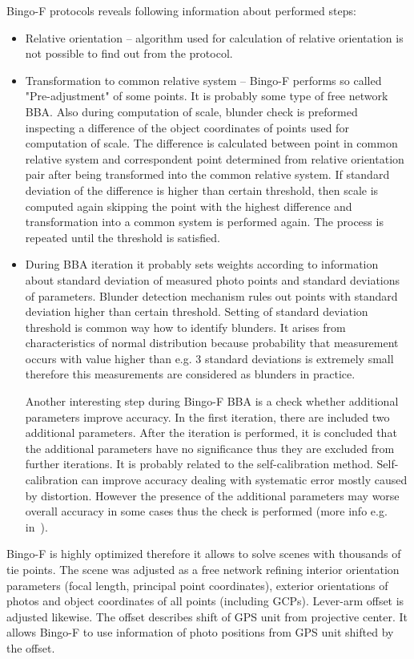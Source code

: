 \documentclass[a4paper,12pt]{article}
\begin{document}
Bingo-F protocols reveals following information about performed steps: 
\begin{itemize}
\item Relative orientation -- algorithm used for calculation of relative orientation is not possible to find out from the protocol.  
\item Transformation to common relative system -- Bingo-F performs so called "Pre-adjustment" of some points. It is probably some type of free network 
BBA. Also during computation of scale, blunder check is preformed inspecting a difference of the object coordinates of points 
used for computation of scale. The difference is calculated between point in common relative system 
and correspondent point determined from relative orientation pair after being transformed into the common relative system.
If standard deviation of the difference is higher than certain threshold, then 
scale is computed again skipping the point with the highest difference and 
transformation into a common system is performed again.
The process is repeated  until  the threshold is satisfied.
\item During BBA iteration it probably sets weights according to information about standard deviation of measured photo points 
and standard deviations of parameters. 
Blunder detection mechanism rules out points with
standard deviation higher than certain threshold. Setting of standard deviation threshold  is common way how to identify 
blunders. It arises from characteristics of normal distribution because probability that measurement occurs with value 
 higher than e.g. 3 standard deviations is extremely small therefore this measurements are considered as blunders in practice.
 
 Another interesting step during Bingo-F BBA is a check whether additional parameters improve accuracy. 
 In the first iteration, there are included two additional parameters. After 
 the iteration is performed, it is concluded that the additional parameters have no significance thus 
 they are excluded from further iterations. It is probably related to the self-calibration 
 method. Self-calibration can improve accuracy dealing with systematic error mostly caused by 
 distortion. However the presence of the additional parameters may worse overall accuracy in some cases thus 
  the check is performed (more info e.g. in~\cite{precision1980grunn}).
\end{itemize}

Bingo-F is highly optimized therefore it allows to solve scenes with thousands of tie points.
The scene was adjusted as a free network refining interior orientation parameters (focal length, principal point coordinates),
exterior orientations of photos and object coordinates of all points (including GCPs). Lever-arm offset is adjusted likewise.
The offset describes 
shift of GPS unit from projective center.  
It allows Bingo-F to use information of photo positions from GPS unit shifted by the offset.  
\end{document}
